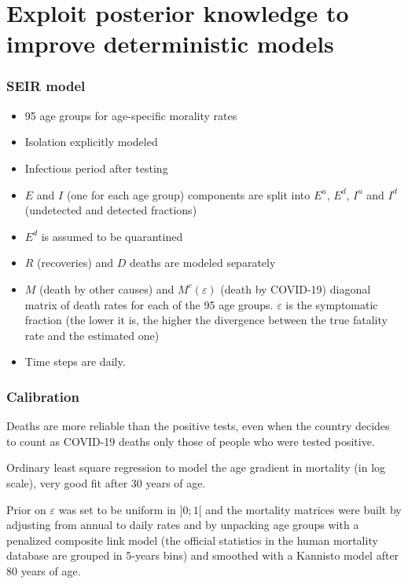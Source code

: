 \documentclass[aspectratio=43]{beamer}
\begin{document}
\section{Exploit posterior knowledge to improve deterministic models~}
\begin{frame}
	\frametitle{SEIR model}
	\begin{itemize}
		\item 95 age groups for age-specific morality rates
		\item Isolation explicitly modeled
		\item Infectious period after testing
		\item $E$ and $I$ (one for each age group) components are split into $E^u$, $E^d$, $I^u$ and $I^d$ (undetected and detected fractions)
		\item $E^d$ is assumed to be quarantined
		\item $R$ (recoveries) and $D$ deaths are modeled separately
		\item $M$ (death by other causes) and $M^c(\varepsilon)$ (death by COVID-19) diagonal matrix of death rates for each of the 95 age groups. $\varepsilon$ is the symptomatic fraction (the lower it is, the higher the divergence between the true fatality rate and the estimated one)
		\item Time steps are daily.
	\end{itemize}
	
\end{frame}

\begin{frame}
	\frametitle{Calibration}
	Deaths are more reliable than the positive tests, even when the country decides to count as COVID-19 deaths only those of people who were tested positive.
	
	Ordinary least square regression to model the age gradient in mortality (in log scale), very good fit after 30 years of age.
	
	Prior on $\varepsilon$ was set to be uniform in $]0; 1[$ and the mortality matrices were built by adjusting from annual to daily rates and by unpacking age groups with a penalized composite link model (the official statistics in the human mortality database are grouped in 5-years bins) and smoothed with a Kannisto model after 80 years of age.
\end{frame}
\end{document}

